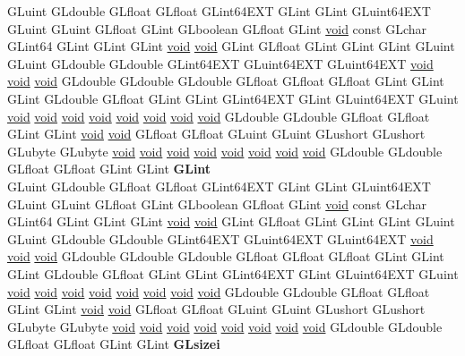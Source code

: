 \begin{DoxyCompactItemize}
\begin{tabbing}
\>GLuint GLdouble GLfloat GLfloat GLint64EXT GLint GLint GLuint64EXT GLuint GLuint GLfloat GLint GLboolean GLfloat GLint \hyperlink{interfacevoid}{void} const GLchar GLint64 GLint GLint GLint \hyperlink{interfacevoid}{void} \hyperlink{interfacevoid}{void} GLint GLfloat GLint GLint GLint GLuint GLuint GLdouble GLdouble GLint64EXT GLuint64EXT GLuint64EXT \hyperlink{interfacevoid}{void} \hyperlink{interfacevoid}{void} \hyperlink{interfacevoid}{void} GLdouble GLdouble GLdouble GLfloat GLfloat GLfloat GLint GLint GLint GLdouble GLfloat GLint GLint GLint64EXT GLint GLuint64EXT GLuint \hyperlink{interfacevoid}{void} \hyperlink{interfacevoid}{void} \hyperlink{interfacevoid}{void} \hyperlink{interfacevoid}{void} \hyperlink{interfacevoid}{void} \hyperlink{interfacevoid}{void} \hyperlink{interfacevoid}{void} \hyperlink{interfacevoid}{void} GLdouble GLdouble GLfloat GLfloat GLint GLint \hyperlink{interfacevoid}{void} \hyperlink{interfacevoid}{void} GLfloat GLfloat GLuint GLuint GLushort GLushort GLubyte GLubyte \hyperlink{interfacevoid}{void} \hyperlink{interfacevoid}{void} \hyperlink{interfacevoid}{void} \hyperlink{interfacevoid}{void} \hyperlink{interfacevoid}{void} \hyperlink{interfacevoid}{void} \hyperlink{interfacevoid}{void} \hyperlink{interfacevoid}{void} GLdouble GLdouble GLfloat GLfloat GLint GLint {\bfseries GLint}\\
\>GLuint GLdouble GLfloat GLfloat GLint64EXT GLint GLint GLuint64EXT GLuint GLuint GLfloat GLint GLboolean GLfloat GLint \hyperlink{interfacevoid}{void} const GLchar GLint64 GLint GLint GLint \hyperlink{interfacevoid}{void} \hyperlink{interfacevoid}{void} GLint GLfloat GLint GLint GLint GLuint GLuint GLdouble GLdouble GLint64EXT GLuint64EXT GLuint64EXT \hyperlink{interfacevoid}{void} \hyperlink{interfacevoid}{void} \hyperlink{interfacevoid}{void} GLdouble GLdouble GLdouble GLfloat GLfloat GLfloat GLint GLint GLint GLdouble GLfloat GLint GLint GLint64EXT GLint GLuint64EXT GLuint \hyperlink{interfacevoid}{void} \hyperlink{interfacevoid}{void} \hyperlink{interfacevoid}{void} \hyperlink{interfacevoid}{void} \hyperlink{interfacevoid}{void} \hyperlink{interfacevoid}{void} \hyperlink{interfacevoid}{void} \hyperlink{interfacevoid}{void} GLdouble GLdouble GLfloat GLfloat GLint GLint \hyperlink{interfacevoid}{void} \hyperlink{interfacevoid}{void} GLfloat GLfloat GLuint GLuint GLushort GLushort GLubyte GLubyte \hyperlink{interfacevoid}{void} \hyperlink{interfacevoid}{void} \hyperlink{interfacevoid}{void} \hyperlink{interfacevoid}{void} \hyperlink{interfacevoid}{void} \hyperlink{interfacevoid}{void} \hyperlink{interfacevoid}{void} \hyperlink{interfacevoid}{void} GLdouble GLdouble GLfloat GLfloat GLint GLint {\bfseries GLsizei}\\

\end{tabbing}
\end{DoxyCompactItemize}
